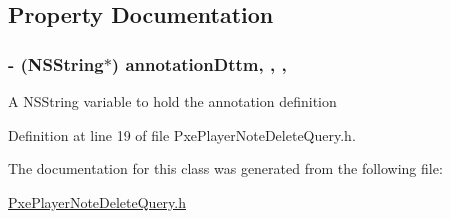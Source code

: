 \subsection{Property Documentation}
\hypertarget{interface_pxe_player_note_delete_query_a8664e285d989554c799c8f60491d4916}{
\subsubsection[{annotation\-Dttm}]{\setlength{\rightskip}{0pt plus 5cm}-\/ (N\-S\-String$\ast$) annotation\-Dttm\hspace{0.3cm}{\ttfamily [read]}, {\ttfamily [write]}, {\ttfamily [nonatomic]}, {\ttfamily [strong]}}}\label{interface_pxe_player_note_delete_query_a8664e285d989554c799c8f60491d4916}
A N\-S\-String variable to hold the annotation definition 

Definition at line 19 of file Pxe\-Player\-Note\-Delete\-Query.\-h.



The documentation for this class was generated from the following file\-:\begin{DoxyCompactItemize}
\item 
\hyperlink{_pxe_player_note_delete_query_8h}{Pxe\-Player\-Note\-Delete\-Query.\-h}\end{DoxyCompactItemize}

